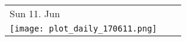 \newpage

\begin{tabularx}{\linewidth}{YYY}
Sun 11. Jun\\
\texttt{[image: plot\_daily\_170611.png]}
\end{tabularx}

